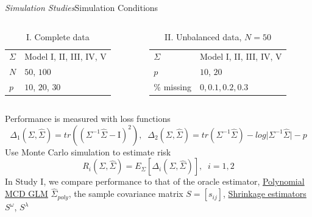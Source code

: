 \begin{frame}{\emph{Simulation Studies}}{Simulation Conditions}\label{simulation-studies-benchmark-estimators}

	\begin{columns}
	\begin{column}[T]{5.5cm}
	\footnotesize
	\centering
	\begin{table}
	\caption*{I. Complete data}
	\begin{tabular}{|l|l|}
	\hline
	$\Sigma$ & Model I, II, III, IV, V \\
	$N$ & $50$, $100$ \\
	$p$ & $10$, $20$, $30$\\
	\hline
	\end{tabular}
	\end{table}
	\end{column}
	\begin{column}[T]{5.5cm}
	\centering
	\footnotesize
	\begin{table}
	\caption*{II. Unbalanced data, $N = 50$}
	\begin{tabular}{|l|l|}
	\hline
	$\Sigma$ & Model I, II, III, IV, V \\
	$p$ & $10$, $20$ \\
	$\%$ missing & $0, 0.1, 0.2, 0.3$	\\
	\hline
	\end{tabular}
	\end{table}
	\end{column}	
	\end{columns}
\footnotesize
Performance is measured with loss functions	
	\[
	\Delta_1\left(\Sigma,\hat{\Sigma} \right) = tr\left(\left( \Sigma^{-1} \hat{\Sigma} - \mathrm{I}\right)^2 \right),\;\;	\Delta_2\left(\Sigma,\hat{\Sigma}\right) = tr\left( \Sigma^{-1} \hat{\Sigma} \right) - log \vert \Sigma^{-1} \hat{\Sigma} \vert - p
	\]
	Use Monte Carlo simulation to estimate risk 
	\[
	R_i \left(\Sigma,\hat{\Sigma}\right) = E_\Sigma\left[\Delta_i\left(\Sigma,\hat{\Sigma}\right)\right],\;\;i = 1,2
	\]
	In Study I, we compare performance to that of the oracle estimator, \hyperlink{polynomial-mcd-model}{Polynomial MCD GLM} $\hat{\Sigma}_{poly}$, the sample covariance matrix $S = \left[s_{ij}\right]$, \hyperlink{shrinkage-estimators}{Shrinkage estimators} $S^\omega$, $S^\lambda$

\end{frame}



